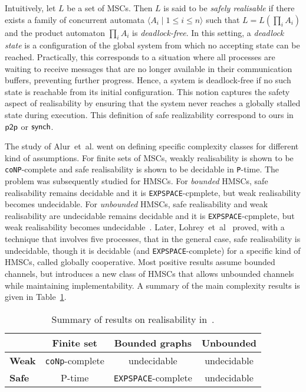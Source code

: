 Intuitively, let $L$ be a set of MSCs. Then $L$ is said to be 
\emph{safely realisable} if there exists a family of concurrent automata 
$\langle A_i \mid 1 \leq i \leq n \rangle$ such that $L = L(\prod_i A_i)$ 
and the product automaton $\prod_i A_i$ is \emph{deadlock-free}. 
In this setting, a \emph{deadlock state} is a configuration of the global 
system from which no accepting state can be reached. 
Practically, this corresponds to a situation where all processes are 
waiting to receive messages that are no longer available in their 
communication buffers, preventing further progress. 
Hence, a system is deadlock-free if no such state is reachable from its 
initial configuration. This notion captures the safety aspect of 
realisability by ensuring that the system never reaches a globally 
stalled state during execution. This definition of safe realizability 
correspond to ours in $\mathsf{p2p}$ or $\mathsf{synch}$.

The study of Alur~et~al. went on defining specific complexity classes 
for different kind of assumptions. For finite sets of MSCs,
weakly realisability is shown to be \verb|coNP|-complete and safe 
realisability is shown to be decidable in \verb|P|-time. The problem
was subsequently studied for HMSCs. For \emph{bounded} HMSCs, safe realisability 
remains decidable and it is \verb|EXPSPACE|-cpmplete, but weak realisability 
becomes undecidable. For \emph{unbounded} HMSCs, 
safe realisability and weak realisability are undecidable
remains decidable and it is \verb|EXPSPACE|-cpmplete, but weak realisability 
becomes undecidable~\cite{alur2005realizability}. 
Later, Lohrey~et~al~\cite{lohrey2003realizability} proved, with a technique
that involves five processes, that in the general case, safe realisability 
is undecidable, though it is decidable (and \verb|EXPSPACE|-complete) 
for a specific kind of HMSCs, called globally cooperative. %
Most positive results assume bounded channels, but \cite{bollig2025high} introduces 
a new class of HMSCs that allows unbounded channels while maintaining implementability.
A summary of the main complexity results is given in Table~\ref{tab:realisability}.

\bigskip

\begin{table}[!ht]
	\centering
	\begin{tabular}{|l|c|c|c|}
		\hline
		& \textbf{Finite set} & \textbf{Bounded graphs} & \textbf{Unbounded} \\
		\hline
		\textbf{Weak} & \verb|coNp|-complete & undecidable & undecidable \\
		\hline
		\textbf{Safe} & P-time & \verb|EXPSPACE|-complete & undecidable \\
		\hline
	\end{tabular}
	\caption{Summary of results on realisability in~\cite{alur2005realizability}.}
	\label{tab:realisability}
\end{table}

